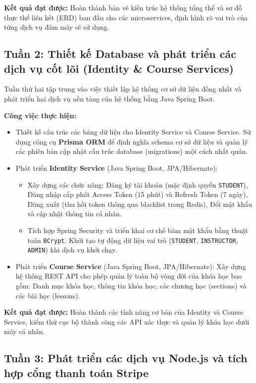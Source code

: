 \textbf{Kết quả đạt được:} Hoàn thành bản vẽ kiến trúc hệ thống tổng thể và sơ đồ thực thể liên kết (ERD) ban đầu cho các microservices, định hình rõ vai trò của từng dịch vụ đám mây sẽ sử dụng.

\subsection{Tuần 2: Thiết kế Database và phát triển các dịch vụ cốt lõi (Identity \& Course Services)}

Tuần thứ hai tập trung vào việc thiết lập hệ thống cơ sở dữ liệu đồng nhất và phát triển hai dịch vụ nền tảng của hệ thống bằng Java Spring Boot.

\textbf{Công việc thực hiện:}
\begin{itemize}
    \item Thiết kế cấu trúc các bảng dữ liệu cho Identity Service và Course Service. Sử dụng công cụ \textbf{Prisma ORM} để định nghĩa schema cơ sở dữ liệu và quản lý các phiên bản cập nhật cấu trúc database (migrations) một cách nhất quán.
    \item Phát triển \textbf{Identity Service} (Java Spring Boot, JPA/Hibernate):
    \begin{itemize}
        \item Xây dựng các chức năng: Đăng ký tài khoản (mặc định quyền \texttt{STUDENT}), Đăng nhập cấp phát Access Token (15 phút) và Refresh Token (7 ngày), Đăng xuất (thu hồi token thông qua blacklist trong Redis), Đổi mật khẩu và cập nhật thông tin cá nhân.
        \item Tích hợp Spring Security và triển khai cơ chế băm mật khẩu bằng thuật toán \texttt{BCrypt}. Khởi tạo tự động dữ liệu vai trò (\texttt{STUDENT}, \texttt{INSTRUCTOR}, \texttt{ADMIN}) khi dịch vụ khởi chạy.
    \end{itemize}
    \item Phát triển \textbf{Course Service} (Java Spring Boot, JPA/Hibernate): Xây dựng hệ thống REST API cho phép quản lý toàn bộ vòng đời của khóa học bao gồm: Danh mục khóa học, thông tin khóa học, các chương học (sections) và các bài học (lessons).
\end{itemize}

\textbf{Kết quả đạt được:} Hoàn thành các tính năng cơ bản của Identity và Course Service, kiểm thử cục bộ thành công các API xác thực và quản lý khóa học dưới máy cá nhân.

\subsection{Tuần 3: Phát triển các dịch vụ Node.js và tích hợp cổng thanh toán Stripe}

